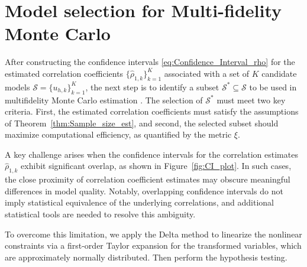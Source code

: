\section{Model selection for Multi-fidelity Monte Carlo}\label{sec:Model_Selection}
After constructing the confidence intervals \eqref{eq:Confidence_Interval_rho} for the estimated correlation coefficients $\{\widehat\rho_{1,k}\}_{k=1}^{K}$ 
associated with a set of $K$ candidate models $\mathcal{S}=\{ u_{h, k}\}_{k=1}^K$, the next step is to identify a subset $\mathcal{S}^* \subseteq \mathcal{S}$ to be used in multifidelity Monte Carlo estimation \cite{PeWiGu:2016}. The selection of $\mathcal{S}^*$ must meet two key criteria. First, the estimated correlation coefficients must satisfy the assumptions of Theorem~\ref{thm:Sample_size_est}, and second, the selected subset should maximize computational efficiency, as quantified by the metric $\xi$.

A key challenge arises when the confidence intervals for the correlation estimates ${\widehat\rho_{1,k}}$ exhibit significant overlap, as shown in Figure~\ref{fig:CI_plot}. In such cases, the close proximity of correlation coefficient estimates may obscure meaningful differences in model quality. Notably, overlapping confidence intervals do not imply statistical equivalence of the underlying correlations, and additional statistical tools are needed to resolve this ambiguity. 

 To overcome this limitation, we apply the Delta method \cite{BeKo:2023,CaBe:1990,LeCa:1998} to linearize the nonlinear constraints via a first-order Taylor expansion for the transformed variables, which are approximately normally distributed. Then perform the hypothesis testing. 
\newline 

